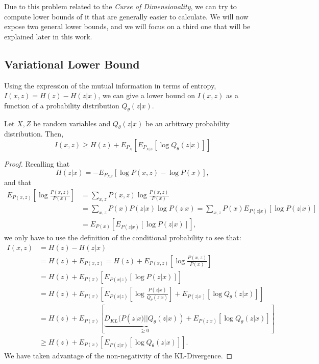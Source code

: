 Due to this problem related to the \emph{Curse of Dimensionality}, we can try to compute lower bounds of it that are generally easier to calculate. We will now expose two general lower bounds, and we will focus on a third one that will be explained later in this work.

\subsection{Variational Lower Bound}



Using the expression of the mutual information in terms of entropy, $I(x,z) = H(z) - H(z|x)$, we can give a lower bound on $I(x,z)$ as a function of a probability distribution $Q_\theta(z|x)$. 

\begin{nprop}
Let $X,Z$ be random variables and $Q_\theta(z|x)$ be an arbitrary probability distribution. Then,
$$
I(x,z) \geq H(z) + E_{P_X} \left[ E_{P_{X|Z}}\left[\log Q_\theta(z|x)\right]\right] 
$$
\end{nprop}

\begin{proof}
Recalling that
$$
H(z|x) = - E_{P_{XZ}} \left[ \log P(x,z) - \log P(x)\right],
$$
and that
\begin{align*}
E_{P(x,z)}\left[\log\frac{P(x,z)}{P(x)}\right] & =  \sum_{x,z} P(x,z) \log\frac{P(x,z)}{P(x)} \\ 
& = \sum_{x,z} P(x)P(z|x) \log P(z|x) = \sum_{x,z} P(x) E_{P(z|x)}[\log P(z|x)]\\
 & =  E_{P(x)}\left[E_{P(z|x)}[\log P(z|x)]\right],
\end{align*}
we only have to use the definition of the conditional probability to see that:
\begin{align*}
I(x,z) & =  H(z) - H(z|x) \\
    & =  H(z) + E_{P(x,z)} = H(z) + E_{P(x,z)} \left[ \log \frac{P(x,z)}{P(x)}\right] \\
    & =  H(z) + E_{P(x)} \left[ E_{P(x|z)}\left[\log P(z|x)\right]\right] \\
    & = H(z) + E_{P(x)} \left[ E_{P(x|z)} \left[\log \frac{P(z|x)}{Q_\theta(z|x)}\right] + E_{P(z|x)}\left[\log Q_\theta(z|x)\right]\right] \\
    & =  H(z) + E_{P(x)}\left[ \underbrace{D_{KL}(P(z|x)||Q_\theta(z|x))}_{\geq 0} + E_{P(z|x)}\left[\log Q_\theta(z|x)\right] \right]\\
    & \geq H(z) + E_{P(x)}\left[E_{P(z|x)}\left[ \log Q_\theta(z|x)\right]\right].
\end{align*}
We have taken advantage of the non-negativity of the KL-Divergence.
\end{proof}

